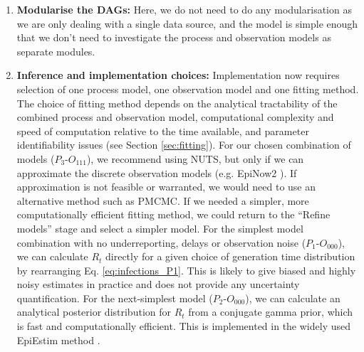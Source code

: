 \documentclass{article}
\begin{document}
\begin{enumerate}
\begin{itemize}
\begin{equation}
        I_t \sim \mathrm{NegBin}\left( R_t \sum_{s=1}^\infty I_{t-s}g_s, k  \right)
    \end{equation}
    where $k$ is the dispersion parameter. 
    \end{itemize} 
Figure \ref{fig:case_study_visual} shows the process \ac{DAG}s and observation \ac{DAG}s for all potential models. Here, $P_1$ is unlikely to be realistic as there will almost always be some source of random variability in daily infection incidence. The choice between $P_2$ and $P_3$ could depend on whether superspreading is known to be a major factor in the transmission dynamics. Since $P_3$ contains $P_2$ in the limiting case $k\to\infty$, we choose to use $P_3$ in this example (see Figure \ref{fig:case_study_diagram}).
Importantly, the negative binomial distribution in $P_3$ captures both potential biological overdispersion (superspreading) and unmodelled variance in the data. We could include additional sources of noise in the observation model (e.g. day-of-the-week reporting effects \citep{abbott2020estimating}) if the data showed evidence for these either on first inspection or during model specification and validation.


\item \textbf{Modularise the DAGs:} Here, we do not need to do any modularisation as we are only dealing with a single data source, and the model is simple enough that we don't need to investigate the process and observation models as separate modules.

\item \textbf{Inference and implementation choices:} Implementation now requires selection of one process model, one observation model and one fitting method. The choice of fitting method depends on the analytical tractability of the combined process and observation model, computational complexity and speed of computation relative to the time available, and parameter identifiability issues (see Section \ref{sec:fitting}). 
For our chosen combination of models ($P_3$-$O_{111}$), we recommend using \ac{NUTS}, but only if we can approximate the discrete observation models (e.g. EpiNow2 \citep{abbott2020estimating}). If approximation is not feasible or warranted, we would need to use an alternative method such as \ac{PMCMC}. If we needed a simpler, more computationally efficient fitting method, we could return to the ``Refine models'' stage and select a simpler model. For the simplest model combination with no underreporting, delays or observation noise ($P_1$-$O_{000}$), we can calculate $R_t$ directly for a given choice of generation time distribution by rearranging Eq. \eqref{eq:infections_P1}. This is likely to give biased and highly noisy estimates in practice and does not provide any uncertainty quantification. For the next-simplest model ($P_2$-$O_{000}$), we can calculate an analytical posterior distribution for $R_t$  from a conjugate gamma prior, which is fast and computationally efficient. This is implemented in the widely used EpiEstim method \citep{cori2013new}. 


\end{enumerate}
\end{document}
